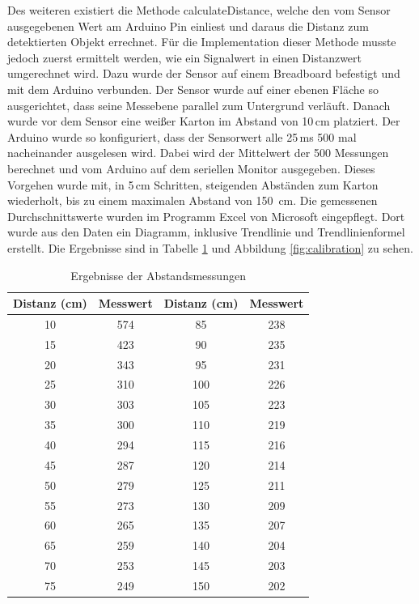         Des weiteren existiert die Methode calculateDistance, welche den vom Sensor ausgegebenen Wert am Arduino Pin einliest und daraus die Distanz zum detektierten Objekt errechnet. Für die Implementation dieser Methode musste jedoch zuerst ermittelt werden, wie ein Signalwert in einen Distanzwert umgerechnet wird. Dazu wurde der Sensor auf einem Breadboard befestigt und mit dem Arduino verbunden. Der Sensor wurde auf einer ebenen Fläche so ausgerichtet, dass seine Messebene parallel zum Untergrund verläuft. Danach wurde vor dem Sensor eine weißer Karton im Abstand von 10\,cm platziert. Der Arduino wurde so konfiguriert, dass der Sensorwert alle 25\,ms 500 mal nacheinander ausgelesen wird. Dabei wird der Mittelwert der 500 Messungen berechnet und vom Arduino auf dem seriellen Monitor ausgegeben. Dieses Vorgehen wurde mit, in 5\,cm Schritten, steigenden Abständen zum Karton wiederholt, bis zu einem maximalen Abstand von 150\, cm. Die gemessenen Durchschnittswerte wurden im Programm Excel von Microsoft eingepflegt. Dort wurde aus den Daten ein Diagramm, inklusive Trendlinie und Trendlinienformel erstellt. Die Ergebnisse sind in Tabelle \ref{tab:calibration} und Abbildung \ref{fig:calibration} zu sehen.

        \begin{table}
            \centering
            \caption{Ergebnisse der Abstandsmessungen}
            \begin{tabular}{ c c || c c } 
                \textbf{Distanz (cm)} & \textbf{Messwert} & \textbf{Distanz (cm)} & \textbf{Messwert}\\ [0.5ex]
                \hline
                \hline
                10 & 574 & 85 & 238\\
                15 & 423 & 90 & 235\\
                20 & 343 & 95 & 231\\
                25 & 310 & 100 & 226\\
                30 & 303 & 105 & 223\\
                35 & 300 & 110 & 219\\
                40 & 294 & 115 & 216\\
                45 & 287 & 120 & 214\\
                50 & 279 & 125 & 211\\
                55 & 273 & 130 & 209\\
                60 & 265 & 135 & 207\\
                65 & 259 & 140 & 204\\
                70 & 253 & 145 & 203\\
                75 & 249 & 150 & 202\\
            \end{tabular}            
            \label{tab:calibration}
        \end{table}

